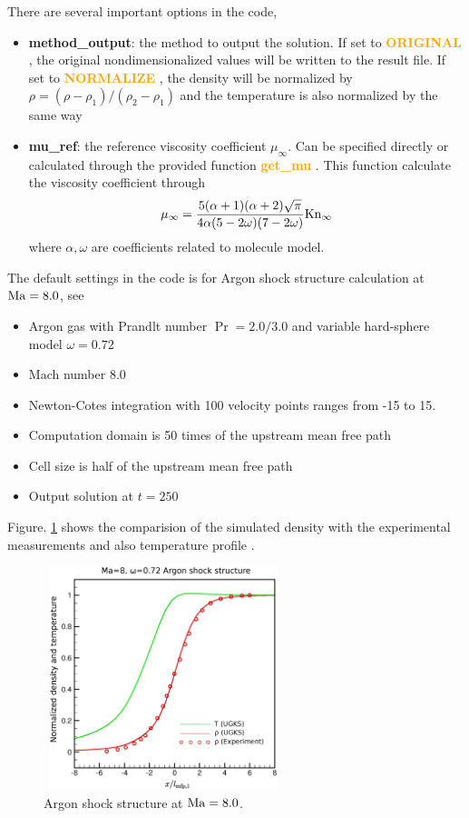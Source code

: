 \documentclass[a4paper]{book}
\newcommand{\hi}[1]{
    \textbf{\textcolor{orange}{#1}}
}
\begin{document}
There are several important options in the code,
\begin{itemize}
    \item \textbf{method\_output}: the method to output the solution. If set to \hi{ORIGINAL}, the original nondimensionalized values will be written to the result file. If set to \hi{NORMALIZE}, the density will be normalized by $\rho = (\rho-\rho_1)/(\rho_2-\rho_1)$ and the temperature is also normalized by the same way
    \item \textbf{mu\_ref}: the reference viscosity coefficient $\mu_\infty$. Can be specified directly or calculated through the provided function \hi{get\_mu}. This function calculate the viscosity coefficient through
        $$\mu_\infty = \frac{5(\alpha+1)(\alpha+2)\sqrt{\pi}}{4\alpha(5-2\omega)(7-2\omega)}{\rm Kn}_\infty$$
        where $\alpha,\omega$ are coefficients related to molecule model. 
\end{itemize}

The default settings in the code is for Argon shock structure calculation at ${\rm Ma}=8.0$, see \cite{Xu2011}
\begin{itemize}
    \item Argon gas with Prandlt number $\Pr=2.0/3.0$ and variable hard-sphere model $\omega=0.72$
    \item Mach number 8.0
    \item Newton-Cotes integration with 100 velocity points ranges from -15 to 15.
    \item Computation domain is 50 times of the upstream mean free path
    \item Cell size is half of the upstream mean free path
    \item Output solution at $t=250$
\end{itemize}

Figure. \ref{pic:shock_solution} shows the comparision of the simulated density with the experimental measurements \cite{Alsmeyer1976} and also temperature profile .

\begin{figure}[htb!]
    \centering
    \includegraphics[width=7cm,height=6.5cm]{shock_Ma8.eps}
    \caption{Argon shock structure at ${\rm Ma}=8.0$.}
    \label{pic:shock_solution}
\end{figure}
\end{document}
